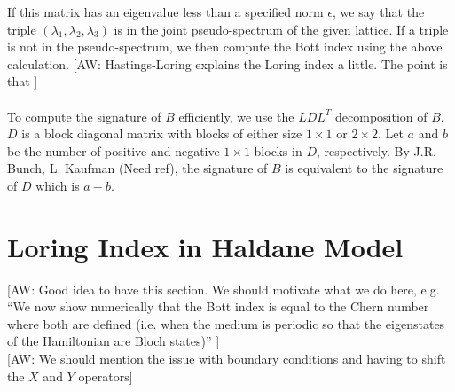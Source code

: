 \documentclass[a4paper]{article}
\newcommand{\aw}[1]{{\color{blue} [AW: #1]}}
\begin{document}
If this matrix has an eigenvalue less than a specified norm $\epsilon$, we say that the triple $(\lambda_1,\lambda_2,\lambda_3)$ is in the joint pseudo-spectrum of the given lattice.
If a triple is not in the pseudo-spectrum, we then compute the Bott index using the above calculation. \aw{Hastings-Loring explains the Loring index a little. The point is that } \\\\
To compute the signature of $B$ efficiently, we use the $LDL^T$ decomposition of $B$.
$D$ is a block diagonal matrix with blocks of either size $1 \times 1$ or $2 \times 2$.
Let $a$ and $b$ be the number of positive and negative $1 \times 1$ blocks in $D$, respectively.
By J.R. Bunch, L. Kaufman (Need ref), the signature of $B$ is equivalent to the signature of $D$ which is $a - b$.

\section{Loring Index in Haldane Model}

\aw{Good idea to have this section. We should motivate what we do here, e.g. ``We now show numerically that the Bott index is equal to the Chern number where both are defined (i.e. when the medium is periodic so that the eigenstates of the Hamiltonian are Bloch states)'' }	\\

\aw{We should mention the issue with boundary conditions and having to shift the $X$ and $Y$ operators}
\end{document}
